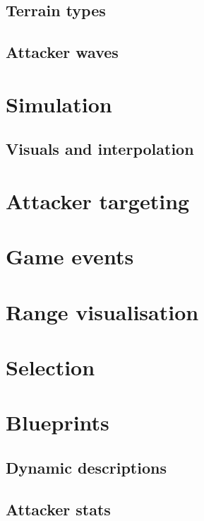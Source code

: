 \subsection{Terrain types}

\subsection{Attacker waves}

\section{Simulation}

\subsection{Visuals and interpolation}

\section{Attacker targeting}

\section{Game events}

\section{Range visualisation}

\section{Selection}

\section{Blueprints}

\subsection{Dynamic descriptions}

\subsection{Attacker stats}